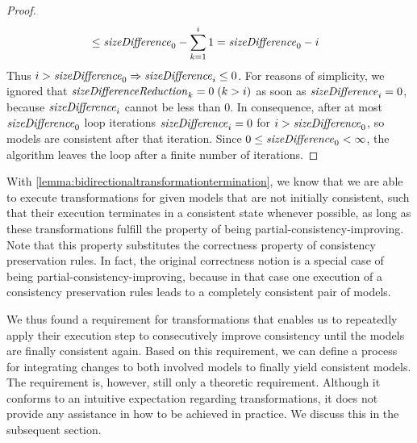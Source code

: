 \begin{proof}
\begin{align*}
        &
        \leq \mathit{sizeDifference}_{0} - \sum_{k=1}^{i} 1 = \mathit{sizeDifference}_{0} - i
    \end{align*}
    Thus
        $i > \mathit{sizeDifference}_{0} \Rightarrow \mathit{sizeDifference}_{i} \leq 0$.
    For reasons of simplicity, we ignored that $\mathit{sizeDifferenceReduction}_{k} = 0\; (k > i)$ as soon as $\mathit{sizeDifference}_{i} = 0$, because $\mathit{sizeDifference}_{i}$ cannot be less than $0$.
    In consequence, after at most $\mathit{sizeDifference}_{0}$ loop iterations $\mathit{sizeDifference}_{i} = 0$ for $i > \mathit{sizeDifference}_{0}$, so models are consistent after that iteration.
    Since $0 \leq \mathit{sizeDifference}_{0} < \infty$, the algorithm leaves the loop after a finite number of iterations.
\end{proof}

With \autoref{lemma:bidirectionaltransformationtermination}, we know that we are able to execute transformations for given models that are not initially consistent, such that their execution terminates in a consistent state whenever possible, as long as these transformations fulfill the property of being partial-consistency-improving.
Note that this property substitutes the correctness property of consistency preservation rules.
In fact, the original correctness notion is a special case of being partial-consistency-improving, because in that case one execution of a consistency preservation rules %
leads to a completely consistent pair of models.

We thus found a requirement for transformations that enables us to repeatedly apply their execution step to consecutively improve consistency until the models are finally consistent again.
Based on this requirement, we can define a process for integrating changes to both involved models to finally yield consistent models.
The requirement is, however, still only a theoretic requirement. 
Although it conforms to an intuitive expectation regarding transformations, it does not provide any assistance in how to be achieved in practice. We discuss this in the subsequent section.


